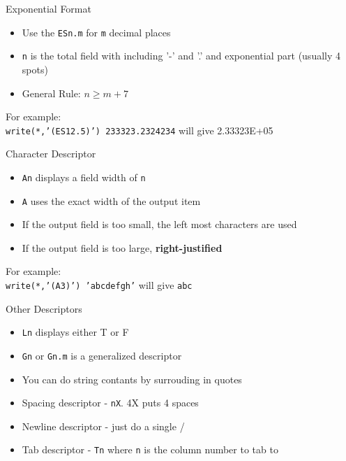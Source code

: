 \documentclass{beamer}
\begin{document}
\begin{frame}{Exponential Format}

  \begin{itemize}
    \item Use the \texttt{ESn.m} for \texttt{m} decimal places
    \vfill\item \texttt{n} is the total field with including '-' and '.' and exponential part (usually 4 spots)
    \vfill\item General Rule: $n \ge m+7$
  \end{itemize}
  \vfill
  For example: \\
  \vfill
  \texttt{write(*,'(ES12.5)') 233323.2324234} will give 2.33323E+05
  \vfill
\end{frame}
\begin{frame}{Character Descriptor}

  \begin{itemize}
    \item \texttt{An} displays a field width of \texttt{n}
    \vfill\item \texttt{A} uses the exact width of the output item
    \vfill\item If the output field is too small, the left most characters are used
    \vfill\item If the output field is too large, \textbf{right-justified}
  \end{itemize}
  \vfill
  For example: \\
  \texttt{write(*,'(A3)') 'abcdefgh'} will give \texttt{abc}

\end{frame}
\begin{frame}{Other Descriptors}

  \begin{itemize}
    \item \texttt{Ln} displays either T or F
    \vfill\item \texttt{Gn} or \texttt{Gn.m} is a generalized descriptor
    \vfill\item You can do string contants by surrouding in quotes
    \vfill\item Spacing descriptor - \texttt{nX}. 4X puts 4 spaces
    \vfill\item Newline descriptor - just do a single /
    \vfill\item Tab descriptor - \texttt{Tn} where \texttt{n} is the column number to tab to 
  \end{itemize}

\end{frame}
\end{document}
